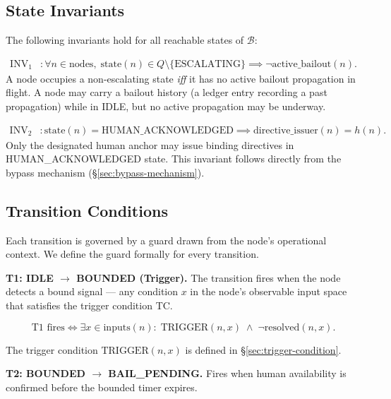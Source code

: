 \subsection{State Invariants}

The following invariants hold for all reachable states of $\mathcal{B}$:

\begin{align}
\text{INV}_1 &: \forall n \in \text{nodes},\;
\text{state}(n) \in Q \setminus \{\text{ESCALATING}\} \implies \neg\text{active\_bailout}(n). \tag{INV-1}
\end{align}
A node occupies a non-escalating state \emph{iff} it has no active bailout propagation in flight. A node may carry a bailout history (a ledger entry recording a past propagation) while in IDLE, but no active propagation may be underway.

\begin{align}
\text{INV}_2 &: \text{state}(n) = \text{HUMAN\_ACKNOWLEDGED} \implies \text{directive\_issuer}(n) = h(n). \tag{INV-2}
\end{align}
Only the designated human anchor may issue binding directives in HUMAN\_ACKNOWLEDGED state. This invariant follows directly from the bypass mechanism (\S\ref{sec:bypass-mechanism}).

\subsection{Transition Conditions}
\label{sec:transition-conditions}

Each transition is governed by a guard drawn from the node's operational context. We define the guard formally for every transition.

\bigskip
\noindent\textbf{T1: IDLE $\rightarrow$ BOUNDED (Trigger).} The transition fires when the node detects a bound signal — any condition $x$ in the node's observable input space that satisfies the trigger condition TC.

\[
\text{T1 fires} \iff \exists x \in \text{inputs}(n):\;
\text{TRIGGER}(n, x) \;\land\; \neg\text{resolved}(n, x). \tag{T1}
\]

The trigger condition $\text{TRIGGER}(n, x)$ is defined in \S\ref{sec:trigger-condition}.

\bigskip
\noindent\textbf{T2: BOUNDED $\rightarrow$ BAIL\_PENDING.} Fires when human availability is confirmed before the bounded timer expires.

